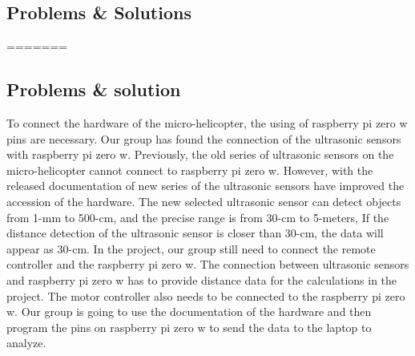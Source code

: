\documentclass[onecolumn, draftclsnofoot,10pt, compsoc]{IEEEtran}
\begin{document}
\subsection{Problems \& Solutions}
=======
\subsection{Problems \& solution}
To connect the hardware of the micro-helicopter, the using of raspberry pi zero w pins are necessary. Our group has found the connection of the ultrasonic sensors with raspberry pi zero w. Previously, the old series of ultrasonic sensors on the micro-helicopter cannot connect to raspberry pi zero w. However, with the released documentation of new series of the ultrasonic sensors have improved the accession of the hardware. The new selected ultrasonic sensor can detect objects from 1-mm to 500-cm, and the precise range is from 30-cm to 5-meters, If the distance detection of the ultrasonic sensor is closer than 30-cm, the data will appear as 30-cm.
In the project, our group still need to connect the remote controller and the raspberry pi zero w. The connection between ultrasonic sensors and raspberry pi zero w has to provide distance data for the calculations in the project. The motor controller also needs to be connected to the raspberry pi zero w. Our group is going to use the documentation of the hardware and then program the pins on raspberry pi zero w to send the data to the laptop to analyze.
\end{document}
